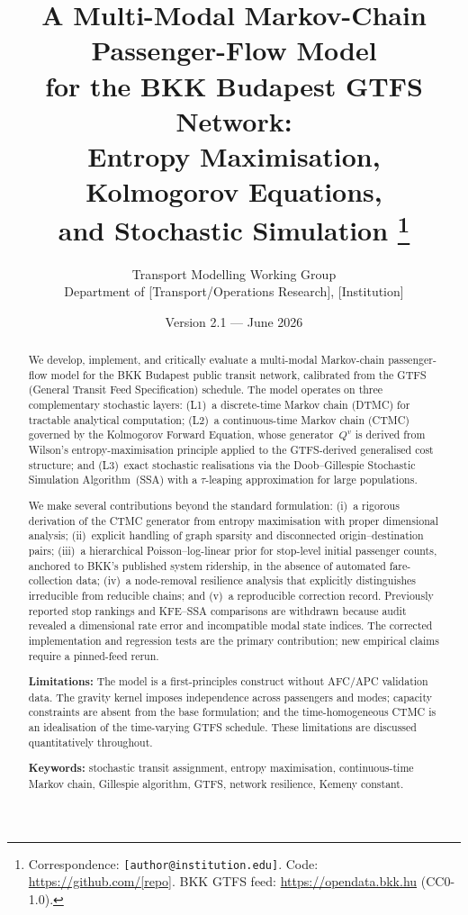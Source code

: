 \documentclass[11pt,a4paper]{article}
\title{%
  A Multi-Modal Markov-Chain Passenger-Flow Model\\
  for the BKK Budapest GTFS Network:\\
  Entropy Maximisation, Kolmogorov Equations,\\
  and Stochastic Simulation%
  \thanks{%
    Correspondence: \texttt{[author@institution.edu]}.
    Code: \url{https://github.com/[repo]}.
    BKK GTFS feed: \url{https://opendata.bkk.hu} (CC0-1.0).}}
\author{Transport Modelling Working Group\\
  Department of [Transport/Operations Research], [Institution]}
\date{Version 2.1 --- June 2026}
\theoremstyle{plain}
\theoremstyle{definition}
\theoremstyle{remark}
\begin{document}
\maketitle

\begin{abstract}
We develop, implement, and critically evaluate a multi-modal Markov-chain
passenger-flow model for the BKK Budapest public transit network, calibrated
from the GTFS (General Transit Feed Specification) schedule.  The model
operates on three complementary stochastic layers: (L1)~a discrete-time Markov
chain (DTMC) for tractable analytical computation; (L2)~a continuous-time
Markov chain (CTMC) governed by the Kolmogorov Forward Equation, whose
generator~$Q^v$ is derived from Wilson's entropy-maximisation principle applied
to the GTFS-derived generalised cost structure; and (L3)~exact stochastic
realisations via the Doob--Gillespie Stochastic Simulation Algorithm~(SSA) with
a $\tau$-leaping approximation for large populations.

We make several contributions beyond the standard formulation:
(i)~a rigorous derivation of the CTMC generator from entropy maximisation with
proper dimensional analysis; (ii)~explicit handling of graph sparsity and
disconnected origin--destination pairs; (iii)~a hierarchical Poisson--log-linear
prior for stop-level initial passenger counts, anchored to BKK's published
system ridership, in the absence of automated fare-collection data;
(iv)~a node-removal resilience analysis that explicitly distinguishes
irreducible from reducible chains; and (v)~a reproducible correction record.
Previously reported stop rankings and KFE--SSA comparisons are withdrawn
because audit revealed a dimensional rate error and incompatible modal state
indices.  The corrected implementation and regression tests are the primary
contribution; new empirical claims require a pinned-feed rerun.

\textbf{Limitations:} The model is a first-principles construct without
AFC/APC validation data.  The gravity kernel imposes independence across
passengers and modes; capacity constraints are absent from the base
formulation; and the time-homogeneous CTMC is an idealisation of the
time-varying GTFS schedule.  These limitations are discussed quantitatively
throughout.

\textbf{Keywords:} stochastic transit assignment, entropy maximisation,
continuous-time Markov chain, Gillespie algorithm, GTFS, network resilience,
Kemeny constant.
\end{abstract}
\end{document}
